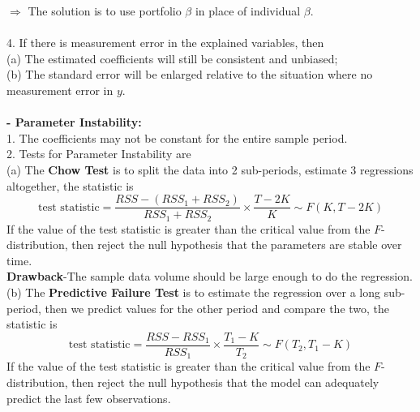 \documentclass{article}
\begin{document}
\begin{enumerate}[S1 - ]
    $\Rightarrow$ The solution is to use portfolio $\beta$ in place of individual $\beta$.\\
    \\
    4. If there is measurement error in the explained variables, then\\
    (a) The estimated coefficients will still be consistent and unbiased;\\
    (b) The standard error will be enlarged relative to the situation where no measurement error in $y$.\\
    \\
    \textbf{- Parameter Instability:}\\
    1. The coefficients may not be constant for the entire sample period.\\
    2. Tests for Parameter Instability are\\
    (a) The \textbf{Chow Test} is to split the data into 2 sub-periods, estimate 3 regressions altogether, the statistic is
    \begin{equation*}
    \text{test statistic} = \frac{RSS-(RSS_1+RSS_2)}{RSS_1+RSS_2} \times \frac{T-2K}{K} \sim F(K,T-2K)
    \end{equation*}
    If the value of the test statistic is greater than the critical value from the $F$-distribution, then reject the null hypothesis that the parameters are stable over time.\\
    \textbf{Drawback}-The sample data volume should be large enough to do the regression.\\
    (b) The \textbf{Predictive Failure Test} is to estimate the regression over a long sub-period, then we predict values for the other period and compare the two, the statistic is
    \begin{equation*}
    \text{test statistic} = \frac{RSS-RSS_1}{RSS_1} \times \frac{T_1-K}{T_2} \sim F(T_2,T_1-K)
    \end{equation*}
    If the value of the test statistic is greater than the critical value from the $F$-distribution, then reject the null hypothesis that the model can adequately predict the last few observations.\\
    

\end{enumerate}
\end{document}
